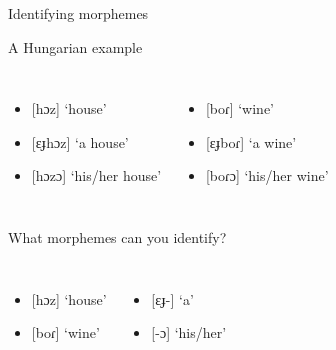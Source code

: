 \documentclass{beamer}
\newcommand{\suboneone}{Identifying morphemes}
\begin{document}
\begin{frame}[t]{\suboneone}
{\begin{block}{A Hungarian example}
\begin{columns}
\begin{itemize}
                  \item {[}hɔz] `house'
                  \item {[}ɛɟhɔz] `a house'
                  \item {[}hɔzɔ] `his/her house'
                \end{itemize}
                \begin{itemize}
                  \item {[}boɾ] `wine'
                  \item {[}ɛɟboɾ] `a wine'
                  \item {[}boɾɔ] `his/her wine'
                \end{itemize}
            \end{columns}
          \end{block}
          \begin{block}{What morphemes can you identify?}
            \begin{columns}
                \begin{itemize}
                  \item<9-> {[}hɔz] `house'
                  \item<9-> {[}boɾ] `wine'
                \end{itemize}
                \begin{itemize}
                  \item<9-> {[}ɛɟ-] `a'
                  \item<9-> {[}-ɔ] `his/her'
                \end{itemize}
            \end{columns}
          \end{block}
        }
      \end{frame}
\end{document}
